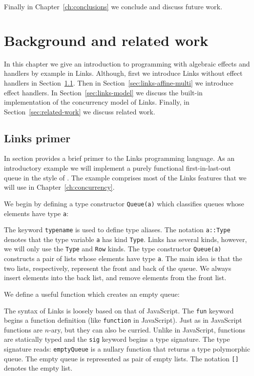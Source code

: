 \documentclass[12pt,mscres,cdtppar,twoside,openright,logo,rightchapter,normalheadings]{infthesis}
\newcommand{\snippet}[1]{}
\theoremstyle{definition}
\begin{document}
Finally in Chapter~\ref{ch:conclusions} we conclude and discuss future
work.


\chapter{Background and related work}
\label{ch:background}
In this chapter we give an introduction to programming with algebraic
effects and handlers by example in Links. Although, first we introduce
Links without effect handlers in Section~\ref{sec:links-primer}. Then
in Section~\ref{sec:links-affine-multi} we introduce effect
handlers. In Section~\ref{sec:links-model} we discuss the built-in
implementation of the concurrency model of Links. Finally, in
Section~\ref{sec:related-work} we discuss related work.

\section{Links primer}
\label{sec:links-primer}
In section provides a brief primer to the Links programming
language. As an introductory example we will implement a purely
functional first-in-last-out queue in the style of
\cite{Okasaki1998}. The example comprises most of the Links features
that we will use in Chapter~\ref{ch:concurrency}.

We begin by defining a type constructor \lstinline$Queue(a)$ which
classifies queues whose elements have type \lstinline$a$:
%
\snippet{queue.links}
%
The keyword \lstinline$typename$ is used to define type aliases. The
notation \lstinline$a::Type$ denotes that the type variable
\lstinline$a$ has kind \lstinline$Type$. Links has several kinds,
however, we will only use the \lstinline$Type$ and \lstinline$Row$
kinds. The type constructor \lstinline$Queue(a)$ constructs a pair of
lists whose elements have type \lstinline$a$. The main idea is that
the two lists, respectively, represent the front and back of the
queue. We always insert elements into the back list, and remove
elements from the front list.

We define a useful function which creates an empty queue:
%
\snippet{emptyQueue.links}
%
The syntax of Links is loosely based on that of JavaScript. The
\lstinline$fun$ keyword begins a function definition (like
\lstinline$function$ in JavaScript). Just as in JavaScript functions
are $n$-ary, but they can also be curried.  Unlike in JavaScript,
functions are statically typed and the \lstinline$sig$ keyword begins
a type signature. The type signature reads: \lstinline$emptyQueue$ is
a nullary function that returns a type polymorphic queue. The empty
queue is represented as pair of empty lists. The notation
\lstinline$[]$ denotes the empty list.
\end{document}
